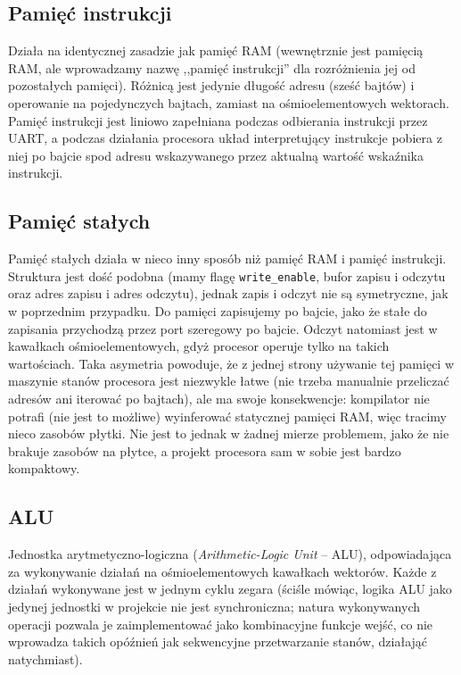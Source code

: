 \subsection{Pamięć instrukcji}

Działa na identycznej zasadzie jak pamięć RAM (wewnętrznie jest pamięcią RAM, ale wprowadzamy nazwę ,,pamięć instrukcji'' dla rozróżnienia jej od pozostałych pamięci). Różnicą jest jedynie długość adresu (sześć bajtów) i operowanie na pojedynczych bajtach, zamiast na ośmioelementowych wektorach. Pamięć instrukcji jest liniowo zapełniana podczas odbierania instrukcji przez UART, a podczas działania procesora układ interpretujący instrukcje pobiera z niej po bajcie spod adresu wskazywanego przez aktualną wartość wskaźnika instrukcji.


\subsection{Pamięć stałych}

Pamięć stałych działa w nieco inny sposób niż pamięć RAM i pamięć instrukcji. Struktura jest dość podobna (mamy flagę \texttt{write\_enable}, bufor zapisu i odczytu oraz adres zapisu i adres odczytu), jednak zapis i odczyt nie są symetryczne, jak w poprzednim przypadku. Do pamięci zapisujemy po bajcie, jako że stałe do zapisania przychodzą przez port szeregowy po bajcie. Odczyt natomiast jest w kawałkach ośmioelementowych, gdyż procesor operuje tylko na takich wartościach. Taka asymetria powoduje, że z jednej strony używanie tej pamięci w maszynie stanów procesora jest niezwykle łatwe (nie trzeba manualnie przeliczać adresów ani iterować po bajtach), ale ma swoje konsekwencje: kompilator nie potrafi (nie jest to możliwe) wyinferować statycznej pamięci RAM, więc tracimy nieco zasobów płytki. Nie jest to jednak w żadnej mierze problemem, jako że nie brakuje zasobów na płytce, a projekt procesora sam w sobie jest bardzo kompaktowy.


\subsection{ALU}

Jednostka arytmetyczno-logiczna (\textit{Arithmetic-Logic Unit} -- ALU), odpowiadająca za wykonywanie działań na ośmioelementowych kawałkach wektorów. Każde z działań wykonywane jest w jednym cyklu zegara (ściśle mówiąc, logika ALU jako jedynej jednostki w projekcie nie jest synchroniczna; natura wykonywanych operacji pozwala je zaimplementować jako kombinacyjne funkcje wejść, co nie wprowadza takich opóźnień jak sekwencyjne przetwarzanie stanów, działająć natychmiast).

